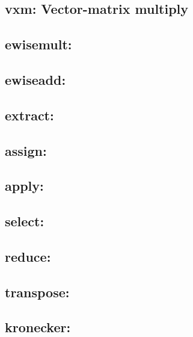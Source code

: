 \subsection{{\sf vxm}: Vector-matrix multiply}


\subsection{{\sf ewisemult}: }

\subsection{{\sf ewiseadd}: }

\subsection{{\sf extract}: }

\subsection{{\sf assign}: }

\subsection{{\sf apply}: }

\subsection{{\sf select}: }

\subsection{{\sf reduce}: }

\subsection{{\sf transpose}: }

\subsection{{\sf kronecker}: }
